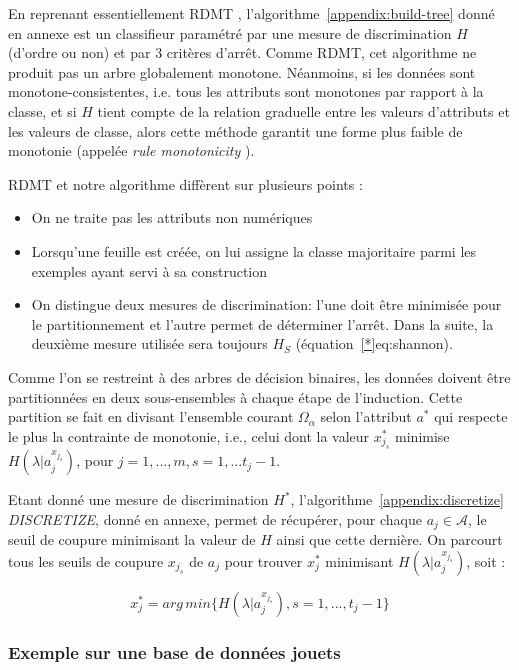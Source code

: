 \documentclass[a4paper]{article}
\renewcommand{\eqref}[1]{équation~\ref{#1}}
\newcommand{\algoref}[1]{algorithme~\ref{#1}}
\begin{document}
En reprenant essentiellement RDMT \cite{marsala-rank},
l'\algoref{appendix:build-tree} donné en annexe est un classifieur paramétré par
une mesure de discrimination $H$ (d'ordre ou non) et par 3 critères d'arrêt.
Comme RDMT, cet algorithme ne produit pas un arbre globalement monotone.
Néanmoins, si les données sont monotone-consistentes, i.e. tous les attributs
sont monotones par rapport à la classe, et si $H$ tient compte de la relation
graduelle entre les valeurs d'attributs et les valeurs de classe, alors cette
méthode garantit une forme plus faible de monotonie (appelée \emph{rule
monotonicity} \cite{hu-rank}). 

RDMT et notre algorithme diffèrent sur plusieurs points :
\begin{itemize}
    \item On ne traite pas les attributs non numériques
    \item Lorsqu'une feuille est créée, on lui assigne la classe majoritaire parmi les exemples ayant servi à sa
construction
    \item On distingue deux mesures de discrimination: l'une doit
être minimisée pour le partitionnement et l'autre permet de déterminer l'arrêt.
        Dans la suite, la deuxième mesure utilisée sera toujours $H_S$
        (\eqref*{eq:shannon}).
\end{itemize}

Comme l'on se restreint à des arbres de décision binaires, les données doivent
être partitionnées en deux sous-ensembles à chaque étape de l'induction. Cette
partition se fait en divisant l'ensemble courant $\Omega_{\alpha}$ selon
l'attribut $a^*$ qui respecte le plus la contrainte de monotonie, i.e., celui
dont la valeur $x^*_{j_s}$ minimise $H(\lambda|a^{x_{j_s}}_j)$, pour $j=1,...,m,
s=1,...t_j-1$. 

Etant donné une mesure de discrimination $H^*$, l'\algoref{appendix:discretize}
\emph{DISCRETIZE}, donné en annexe, permet de récupérer, pour chaque $a_j \in
\mathcal{A}$, le seuil de coupure minimisant la valeur de $H$ ainsi que cette
dernière. On parcourt tous les seuils de coupure $x_{j_s}$ de $a_j$ pour trouver
$x^*_{j}$ minimisant $H(\lambda|a^{x_{j_s}}_j)$, soit :

$$ x^*_{j} = arg\,min \{H(\lambda|a^{x_{j_s}}_j), s=1,...,t_j -1\}$$

\subsubsection{Exemple sur une base de données jouets}
\end{document}
